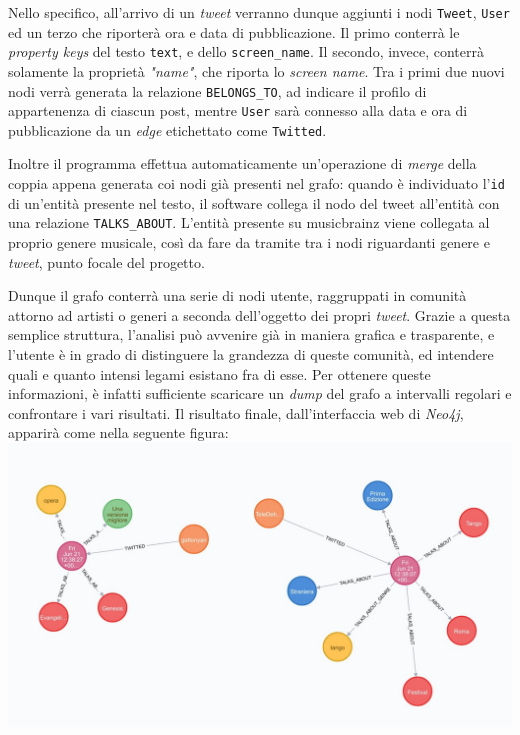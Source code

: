 \documentclass[12pt, a4paper, twocolumn]{article} %
\begin{document}
Nello specifico, all'arrivo di un \textit{tweet} verranno dunque aggiunti i nodi \verb|Tweet|, \verb|User| ed un terzo che riporterà ora e data di pubblicazione.
Il primo conterrà le \textit{property keys} del testo \verb|text|, e dello \verb|screen_name|. 
Il secondo, invece, conterrà solamente la proprietà \textit{"name"}, che riporta lo \textit{screen name}. 
Tra i primi due nuovi nodi verrà generata la relazione \verb|BELONGS_TO|, ad indicare il profilo di appartenenza di ciascun post, mentre \verb|User| sarà connesso alla data e ora di pubblicazione da un \textit{edge} etichettato come \verb|Twitted|.

Inoltre il programma effettua automaticamente un'operazione di \textit{merge} della coppia appena generata coi nodi già presenti nel grafo: quando è individuato l'\verb|id| di un'entità presente nel testo, il software collega il nodo del tweet all'entità con una relazione \verb|TALKS_ABOUT|.
L'entità presente su musicbrainz viene collegata al proprio genere musicale, così da fare da tramite tra i nodi riguardanti genere e \textit{tweet}, punto focale del progetto.

Dunque il grafo conterrà una serie di nodi utente, raggruppati in comunità attorno ad artisti o generi a seconda dell'oggetto dei propri \textit{tweet}.
Grazie a questa semplice struttura, l'analisi può avvenire già in maniera grafica e trasparente, e l'utente è in grado di distinguere la grandezza di queste comunità, ed intendere quali e quanto intensi legami esistano fra di esse.
Per ottenere queste informazioni, è infatti sufficiente scaricare un \textit{dump} del grafo a intervalli regolari e confrontare i vari risultati.
Il risultato finale, dall'interfaccia web di \textit{Neo4j}, apparirà come nella seguente figura:
\includegraphics[width=\linewidth]{small_graph.png}
\end{document}
